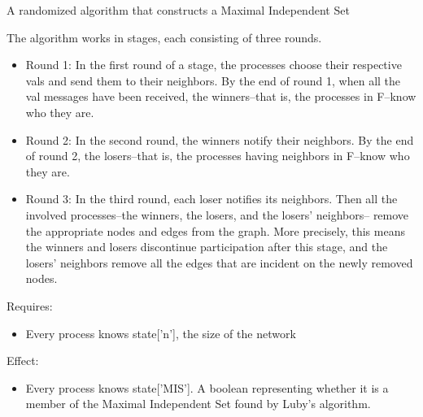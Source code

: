 A randomized algorithm that constructs a Maximal Independent Set

The algorithm works in stages, each consisting of three rounds.

\begin{itemize}
\setlength{\parskip}{0.6ex}
  \item Round 1: In the first round of a stage, the processes choose their 
    respective vals and send them to their neighbors. By the end of round 
    1, when all the val messages have been received, the winners--that is, 
    the processes in F--know who they are.

  \item Round 2: In the second round, the winners notify their neighbors. By 
    the end of round 2, the losers--that is, the processes having neighbors
    in F--know who they are.

  \item Round 3: In the third round, each loser notifies its neighbors. Then 
    all the involved processes--the winners, the losers, and the losers' 
    neighbors-- remove the appropriate nodes and edges from the graph. More
    precisely, this means the winners and losers discontinue participation 
    after this stage, and the losers' neighbors remove all the edges that 
    are incident on the newly removed nodes.

\end{itemize}

Requires:

\begin{itemize}
\setlength{\parskip}{0.6ex}
  \item Every process knows state['n'], the size of the network

\end{itemize}

Effect:

\begin{itemize}
\setlength{\parskip}{0.6ex}
  \item Every process knows state['MIS']. A boolean representing whether it is 
    a member of the Maximal Independent Set found by Luby's algorithm.

\end{itemize}



